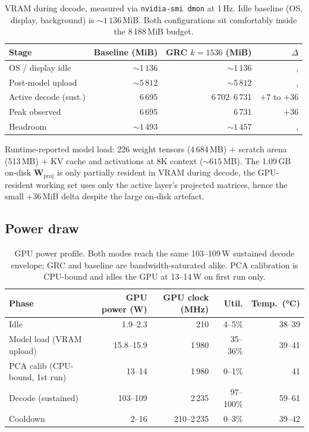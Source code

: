 \documentclass[11pt]{article}
\providecommand{\Wmat}{\mathbf{W}}
\begin{document}
\begin{table}[h]\centering\footnotesize
\caption{VRAM during decode, measured via \texttt{nvidia-smi dmon} at 1\,Hz.
Idle baseline (OS, display, background) is ${\sim}1\,136$\,MiB. Both
configurations sit comfortably inside the 8\,188\,MiB budget.}
\begin{tabular}{@{}lrrr@{}}
\toprule
Stage & Baseline (MiB) & GRC $k{=}1536$ (MiB) & $\Delta$ \\
\midrule
OS / display idle      & ${\sim}1\,136$        & ${\sim}1\,136$        & , \\
Post-model upload      & ${\sim}5\,812$        & ${\sim}5\,812$        & , \\
Active decode (sust.)  & 6\,695                & 6\,702--6\,731        & $+7$ to $+36$\\
Peak observed          & 6\,695                & 6\,731                & $+36$\\
Headroom               & ${\sim}1\,493$        & ${\sim}1\,457$        & , \\
\bottomrule
\end{tabular}
\end{table}

Runtime-reported model load: 226 weight tensors (4\,684\,MB) +
scratch arena (513\,MB) + KV cache and activations at 8K context
(${\sim}615$\,MB). The 1.09\,GB on-disk $\Wmat_\text{proj}$ is only
partially resident in VRAM during decode, the GPU-resident working
set uses only the active layer's projected matrices, hence the small +36\,MiB
delta despite the large on-disk artefact.

\subsection{Power draw}

\begin{table}[h]\centering\footnotesize
\caption{GPU power profile. Both modes reach the same 103--109\,W sustained
decode envelope; GRC and baseline are bandwidth-saturated alike. PCA
calibration is CPU-bound and idles the GPU at 13--14\,W on first run only.}
\begin{tabular}{@{}lrrrr@{}}
\toprule
Phase & GPU power (W) & GPU clock (MHz) & Util. & Temp.\ (°C)\\
\midrule
Idle                       & 1.9--2.3   & 210         & 4--5\%     & 38--39\\
Model load (VRAM upload)   & 15.8--15.9 & 1\,980      & 35--36\%   & 39--41\\
PCA calib (CPU-bound, 1st run)
                           & 13--14     & 1\,980      & 0--1\%     & 41\\
Decode (sustained)         & 103--109   & 2\,235      & 97--100\%  & 59--61\\
Cooldown                   & 2--16      & 210--2\,235 & 0--3\%     & 39--42\\
\bottomrule
\end{tabular}
\end{table}
\end{document}
